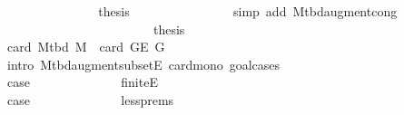 \begin{isabellebody}
\ \ \ \ \ \ \ \ \ \ \ \ \isamarkupfalse%
\ \isamarkupfalse%
\ {\isacharquery}{\kern0pt}thesis\isanewline
\ \ \ \ \ \ \ \ \ \ \ \ \ \ \isamarkupfalse%
\ {\isacharparenleft}{\kern0pt}simp\ add{\isacharcolon}{\kern0pt}\ M{\isacharunderscore}{\kern0pt}tbd{\isacharunderscore}{\kern0pt}augment{\isacharunderscore}{\kern0pt}cong{\isacharparenright}{\kern0pt}\isanewline
\ \ \ \ \ \ \ \ \ \ \isamarkupfalse%
\isanewline
\ \ \ \ \ \ \ \ \ \ \isamarkupfalse%
\ \isamarkupfalse%
\ {\isacharquery}{\kern0pt}thesis\isanewline
\ \ \ \ \ \ \ \ \ \ \ \ \isacommand{{\isachardot}{\kern0pt}}\isamarkupfalse%
\isanewline
\ \ \ \ \ \ \ \ \isamarkupfalse%
%
\endisataginvisible
{\isafoldinvisible}%
%
\isadeliminvisible
\isanewline
%
\endisadeliminvisible
%
\isadelimvisible
\ \ \ \ \ \ \ \ %
\endisadelimvisible
%
\isatagvisible
{}\isamarkupfalse%
\ \isamarkupfalse%
\ {\isachardoublequoteopen}card\ {\isacharparenleft}{\kern0pt}M{\isacharunderscore}{\kern0pt}tbd\ {\isacharquery}{\kern0pt}M{\isacharparenright}{\kern0pt}\ {\isasymle}\ card\ {\isacharparenleft}{\kern0pt}G{\isachardot}{\kern0pt}E\ G{\isacharparenright}{\kern0pt}{\isachardoublequoteclose}%
\endisatagvisible
{\isafoldvisible}%
%
\isadelimvisible
\isanewline
%
\endisadelimvisible
%
\isadeliminvisible
\ \ \ \ \ \ \ \ %
\endisadeliminvisible
%
\isataginvisible
{}\isamarkupfalse%
\ {\isacharparenleft}{\kern0pt}intro\ M{\isacharunderscore}{\kern0pt}tbd{\isacharunderscore}{\kern0pt}augment{\isacharunderscore}{\kern0pt}subset{\isacharunderscore}{\kern0pt}E\ card{\isacharunderscore}{\kern0pt}mono{\isacharcomma}{\kern0pt}\ goal{\isacharunderscore}{\kern0pt}cases{\isacharparenright}{\kern0pt}\isanewline
\ \ \ \ \ \ \ \ \ \ \isamarkupfalse%
\ {}\isanewline
\ \ \ \ \ \ \ \ \ \ \isamarkupfalse%
\ {\isacharquery}{\kern0pt}case\isanewline
\ \ \ \ \ \ \ \ \ \ \ \ \isamarkupfalse%
\ finite{\isacharunderscore}{\kern0pt}E\isanewline
\ \ \ \ \ \ \ \ \ \ \ \ \isacommand{{\isachardot}{\kern0pt}}\isamarkupfalse%
\isanewline
\ \ \ \ \ \ \ \ \isamarkupfalse%
\isanewline
\ \ \ \ \ \ \ \ \ \ \isamarkupfalse%
\ {}\isanewline
\ \ \ \ \ \ \ \ \ \ \isamarkupfalse%
\ {\isacharquery}{\kern0pt}case\isanewline
\ \ \ \ \ \ \ \ \ \ \ \ \isamarkupfalse%
\ less{\isachardot}{\kern0pt}prems\isanewline
\ \ \ \ \ \ \ \ \ \ \ \ \isamarkupfalse%

\end{isabellebody}
